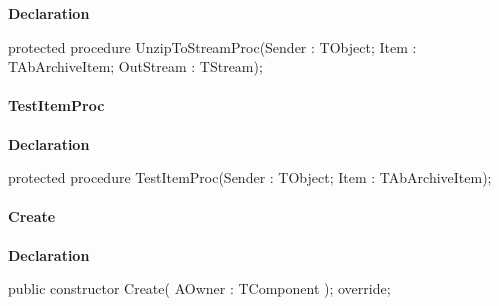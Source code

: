\documentclass{report}
\newif\ifpdf
\begin{document}
\label{AbUnzper.TAbCustomUnZipper-UnzipToStreamProc}
\begin{list}{}{
\setlength{\itemindent}{0cm}
\setlength{\listparindent}{0cm}
\setlength{\leftmargin}{\evensidemargin}
\addtolength{\leftmargin}{\tmplength}
\settowidth{\labelsep}{X}
\addtolength{\leftmargin}{\labelsep}
\setlength{\labelwidth}{\tmplength}
}
\item[\textbf{Declaration}\hfill]
\ifpdf
\begin{flushleft}
\fi
\begin{ttfamily}
protected procedure UnzipToStreamProc(Sender : TObject; Item : TAbArchiveItem; OutStream : TStream);\end{ttfamily}

\ifpdf
\end{flushleft}
\fi

\end{list}
\paragraph*{TestItemProc}\hspace*{\fill}

\label{AbUnzper.TAbCustomUnZipper-TestItemProc}
\begin{list}{}{
\setlength{\itemindent}{0cm}
\setlength{\listparindent}{0cm}
\setlength{\leftmargin}{\evensidemargin}
\addtolength{\leftmargin}{\tmplength}
\settowidth{\labelsep}{X}
\addtolength{\leftmargin}{\labelsep}
\setlength{\labelwidth}{\tmplength}
}
\item[\textbf{Declaration}\hfill]
\ifpdf
\begin{flushleft}
\fi
\begin{ttfamily}
protected procedure TestItemProc(Sender : TObject; Item : TAbArchiveItem);\end{ttfamily}

\ifpdf
\end{flushleft}
\fi

\end{list}
\paragraph*{Create}\hspace*{\fill}

\label{AbUnzper.TAbCustomUnZipper-Create}
\begin{list}{}{
\setlength{\itemindent}{0cm}
\setlength{\listparindent}{0cm}
\setlength{\leftmargin}{\evensidemargin}
\addtolength{\leftmargin}{\tmplength}
\settowidth{\labelsep}{X}
\addtolength{\leftmargin}{\labelsep}
\setlength{\labelwidth}{\tmplength}
}
\item[\textbf{Declaration}\hfill]
\ifpdf
\begin{flushleft}
\fi
\begin{ttfamily}
public constructor Create( AOwner : TComponent ); override;\end{ttfamily}

\ifpdf
\end{flushleft}
\fi

\end{list}
\end{document}
